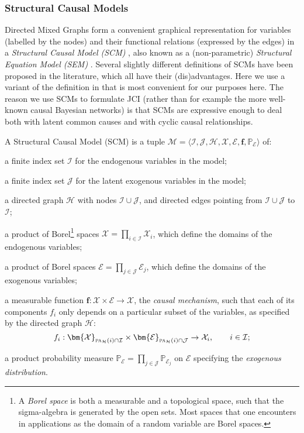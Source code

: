 \documentclass[twoside,11pt]{article}
\newcommand{\Prb}{\mathbb{P}}
\newcommand\B[1]{\bm{#1}}
\newcommand\C[1]{\mathcal{#1}}
\newcommand\BC[1]{\bm{\mathcal{#1}}}
\newcommand\mathbfsc[1]{\text{\normalfont\scshape#1}}
\newcommand\pasub[2]{\mathbfsc{pa}_{#1}(#2)}
\begin{document}
\subsubsection{Structural Causal Models}
Directed Mixed Graphs form a convenient graphical representation for
variables (labelled by the nodes) and their functional relations (expressed
by the edges) in a \emph{Structural Causal Model (SCM)} \citep{Pearl2009},
also known as a (non-parametric) \emph{Structural Equation Model (SEM)} \citep{Wright1921}.
Several slightly different definitions of SCMs have been proposed in the literature, which 
all have their (dis)advantages. Here we use a variant of the definition in 
\citet{Bongers++_1611.06221v2} that is most convenient for our purposes here.
The reason we use SCMs to formulate JCI (rather than for example the 
more well-known causal Bayesian networks) is that SCMs are expressive enough 
to deal both with latent common causes and with cyclic causal relationships.
\begin{definition}
A Structural Causal Model (SCM) is a tuple $\C{M} = \langle \C{I}, \C{J}, \C{H}, \BC{X}, \BC{E}, \B{f}, \Prb_{\BC{E}} \rangle$ of:
\begin{compactenum}[(i)]
\item a finite index set $\C{I}$ for the endogenous variables in the model;
\item a finite index set $\C{J}$ for the latent exogenous variables in the model;
\item a directed graph $\C{H}$ with nodes $\C{I} \cup \C{J}$, and directed edges pointing from
$\C{I} \cup \C{J}$ to $\C{I}$;
\item a product of Borel\footnote{A \emph{Borel space} is both a measurable and a topological space, such that
the sigma-algebra is generated by the open sets. Most spaces that one encounters in applications as the domain of a random variable are Borel spaces.} spaces $\BC{X} = \prod_{i \in \C{I}} \C{X}_i$, which define the
    domains of the endogenous variables; 
\item a product of Borel spaces $\BC{E} = \prod_{j \in \C{J}} \C{E}_j$, which define the
    domains of the exogenous variables;
\item a measurable function $\B{f} : \BC{X} \times \BC{E} \to \BC{X}$, the \emph{causal
    mechanism}, such that each of its components $f_i$ only depends on a particular subset of the variables, as
specified by the directed graph $\C{H}$:
      $$f_i : \BC{X}_{\pasub{\C{H}}{i} \cap \C{I}} \times \BC{E}_{\pasub{\C{H}}{i} \cap \C{J}} \to \C{X}_i, \qquad i \in \C{I};$$
\item a product probability measure $\Prb_{\BC{E}} = \prod_{j \in \C{J}} \Prb_{\C{E}_j}$ on $\BC{E}$ specifying
    the \emph{exogenous distribution}.
\end{compactenum}
\end{definition}
\end{document}
